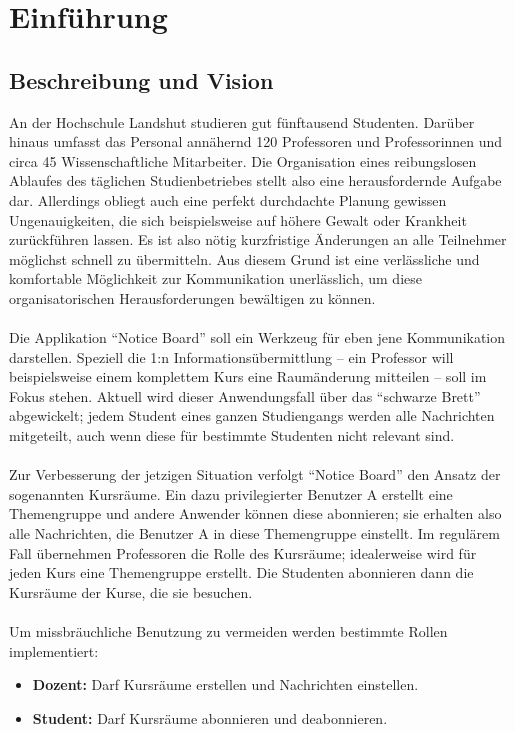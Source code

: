 \chapter{Einführung}
\section{Beschreibung und Vision}
An der Hochschule Landshut studieren gut fünftausend Studenten. 
Darüber hinaus umfasst das Personal annähernd 120 Professoren und Professorinnen und circa 45 Wissenschaftliche Mitarbeiter.
Die Organisation eines reibungslosen Ablaufes des täglichen Studienbetriebes stellt also eine herausfordernde Aufgabe dar.
Allerdings obliegt auch eine perfekt durchdachte Planung gewissen Ungenauigkeiten, die sich beispielsweise auf höhere Gewalt oder Krankheit zurückführen lassen.
Es ist also nötig kurzfristige Änderungen an alle Teilnehmer möglichst schnell zu übermitteln.
Aus diesem Grund ist eine verlässliche und komfortable Möglichkeit zur Kommunikation unerlässlich, um diese organisatorischen Herausforderungen bewältigen zu können.\\
\\
Die Applikation \enquote{Notice Board} soll ein Werkzeug für eben jene Kommunikation darstellen.
Speziell die 1:n Informationsübermittlung -- ein Professor will beispielsweise einem komplettem Kurs eine Raumänderung mitteilen -- soll im Fokus stehen.
Aktuell wird dieser Anwendungsfall über das \enquote{schwarze Brett} abgewickelt; jedem Student eines ganzen Studiengangs werden alle Nachrichten mitgeteilt, auch wenn diese für bestimmte Studenten nicht relevant sind.\\
\\
Zur Verbesserung der jetzigen Situation verfolgt \enquote{Notice Board} den Ansatz der sogenannten Kursräume.
Ein dazu privilegierter Benutzer A erstellt eine Themengruppe und andere Anwender können diese abonnieren; sie erhalten also alle Nachrichten, die Benutzer A in diese Themengruppe einstellt.
Im regulärem Fall übernehmen Professoren die Rolle des Kursräume; idealerweise wird für jeden Kurs eine Themengruppe erstellt.
Die Studenten abonnieren dann die Kursräume der Kurse, die sie besuchen.\\
\\
Um missbräuchliche Benutzung zu vermeiden werden bestimmte Rollen implementiert:
\begin{itemize}
\item \textbf{Dozent:} Darf Kursräume erstellen und Nachrichten einstellen.
\item \textbf{Student:} Darf Kursräume abonnieren und deabonnieren. 
\end{itemize}

